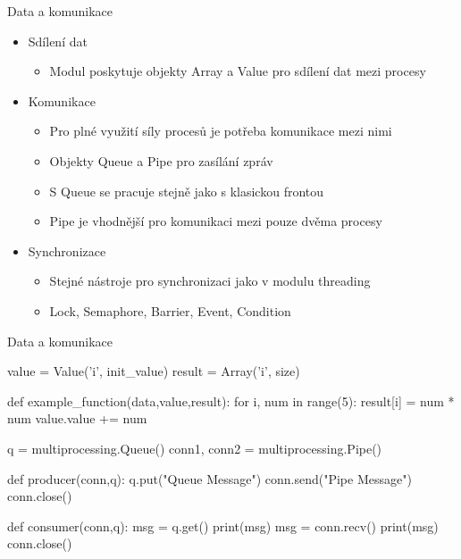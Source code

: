 \documentclass{beamer}
\begin{document}
\begin{frame}{Data a komunikace}
    \begin{itemize}
        \item Sdílení dat
        \begin{itemize}
            \item Modul poskytuje objekty Array a Value pro sdílení dat mezi procesy
        \end{itemize}

        \item Komunikace
        \begin{itemize}
            \item Pro plné využití síly procesů je potřeba komunikace mezi nimi
            \item Objekty Queue a Pipe pro zasílání zpráv
            \item S Queue se pracuje stejně jako s klasickou frontou
            \item Pipe je vhodnější pro komunikaci mezi pouze dvěma procesy
        \end{itemize}
        \item Synchronizace
        \begin{itemize}
            \item Stejné nástroje pro synchronizaci jako v modulu threading
            \item Lock, Semaphore, Barrier, Event, Condition
        \end{itemize}
    \end{itemize}
\end{frame}

\begin{frame}[fragile]{Data a komunikace}
    \scriptsize
    \begin{semiverbatim}
    value = Value('i', init_value)  
    result = Array('i', size)
    
    def example_function(data,value,result):  
        for i, num in range(5):  
            result[i] = num * num  
            value.value += num

    q = multiprocessing.Queue()
    conn1, conn2 = multiprocessing.Pipe()

    def producer(conn,q):
        q.put("Queue Message")
        conn.send("Pipe Message")
        conn.close()

    def consumer(conn,q):
        msg = q.get()
        print(msg)
        msg = conn.recv()
        print(msg)
        conn.close()
    \end{semiverbatim}
\end{frame}
\end{document}
